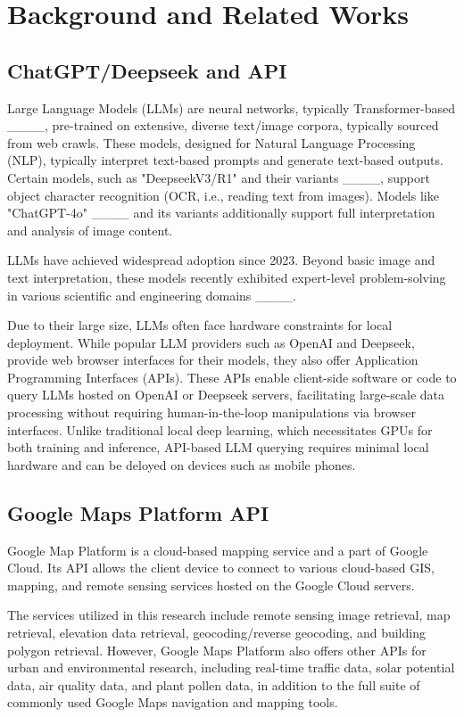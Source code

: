 \section{Background and Related Works}
\subsection{ChatGPT/Deepseek and API}
Large Language Models (LLMs) are neural networks, typically Transformer-based ____, pre-trained on extensive, diverse text/image corpora, typically sourced from web crawls. These models, designed for Natural Language Processing (NLP), typically interpret text-based prompts and generate text-based outputs. Certain models, such as "DeepseekV3/R1" and their variants ____, support object character recognition (OCR, i.e., reading text from images). Models like "ChatGPT-4o" ____ and its variants additionally support full interpretation and analysis of image content.

LLMs have achieved widespread adoption since 2023. Beyond basic image and text interpretation, these models recently exhibited expert-level problem-solving in various scientific and engineering domains ____.

Due to their large size, LLMs often face hardware constraints for local deployment. While popular LLM providers such as OpenAI and Deepseek, provide web browser interfaces for their models, they also offer Application Programming Interfaces (APIs). These APIs enable client-side software or code to query LLMs hosted on OpenAI or Deepseek servers, facilitating large-scale data processing without requiring human-in-the-loop manipulations via browser interfaces. Unlike traditional local deep learning, which necessitates GPUs for both training and inference, API-based LLM querying requires minimal local hardware and can be deloyed on devices such as mobile phones. 

\subsection{Google Maps Platform API}
Google Map Platform is a cloud-based mapping service and a part of Google Cloud. Its API allows the client device to connect to various cloud-based GIS, mapping, and remote sensing services hosted on the Google Cloud servers. 

The services utilized in this research include remote sensing image retrieval, map retrieval, elevation data retrieval, geocoding/reverse geocoding, and building polygon retrieval. However, Google Maps Platform also offers other APIs for urban and environmental research, including real-time traffic data, solar potential data, air quality data, and plant pollen data, in addition to the full suite of commonly used Google Maps navigation and mapping tools. 

